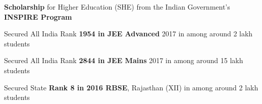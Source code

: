 \vspace{3mm}
\begin{cvitems}
  \item \textbf{Scholarship} for Higher Education (SHE) from the Indian Government's \textbf{INSPIRE Program}
  \item Secured All India Rank \textbf{1954 in JEE Advanced} 2017 in among around 2 lakh students
  \item Secured All India Rank \textbf{2844 in JEE Mains} 2017 in among around 15 lakh students
  \item Secured State \textbf{Rank 8 in 2016 RBSE}, Rajasthan (XII) in among around 2 lakh students
\end{cvitems}
\vspace{2mm}
